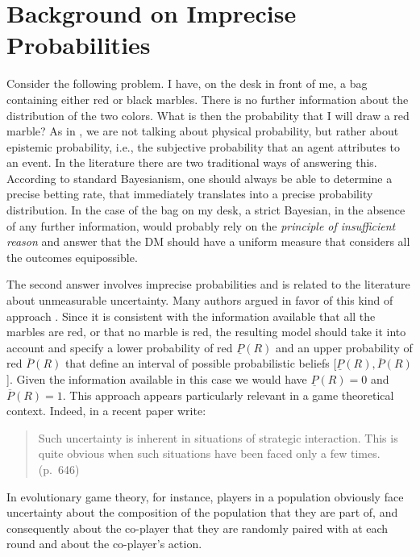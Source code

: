 \documentclass[fleqn,reqno,12pt]{article}
\theoremstyle{Satz}
\theoremstyle{Bsp}
\begin{document}
\appendix

\section{Background on Imprecise Probabilities}
\label{sec:impr-prob-beli}

Consider the following problem. I have, on the desk in front of me, a bag containing either red
or black marbles. There is no further information about the distribution of the two
colors. What is then the probability that I will draw a red marble? As in \citet{walley96}, we
are not talking about physical probability, but rather about epistemic probability, i.e., the
subjective probability that an agent attributes to an event.  In the literature there are two
traditional ways of answering this. According to standard Bayesianism, one should always be
able to determine a precise betting rate, that immediately translates into a precise
probability distribution. In the case
of the bag on my desk, a strict Bayesian, in the absence of any further information, would
probably rely on the \textit{principle of insufficient reason} and answer that the DM should
have a uniform measure that considers all the outcomes equipossible.


The second answer involves imprecise probabilities and is related to the literature about
unmeasurable uncertainty. Many authors argued in favor of this kind of approach
\citep[e.g.,][]{levi74,gardsah82,walley96}. Since it is consistent with the information
available that all the marbles are red, or that no marble is red, the resulting model should
take it into account and specify a lower probability of red $\underline{P}(R)$ and an upper
probability of red $\overline{P}(R)$ that define an interval of possible probabilistic beliefs
[$\underline{P}(R), \overline{P}(R)$]. Given the information available in this case we would
have $\underline{P}(R)=0$ and $\overline{P}(R)=1$. This approach appears particularly relevant
in a game theoretical context. Indeed, in a recent paper \citet{BattCerrMM15} write:

\begin{quote}
  Such uncertainty is inherent in situations of strategic interaction. This is quite obvious
  when such situations have been faced only a few times. (p.~646)
\end{quote}

\noindent In evolutionary game theory, for instance, players in a population obviously face
uncertainty about the composition of the population that they are part of, and consequently
about the co-player that they are randomly paired with at each round and about the co-player's
action. 
\end{document}

